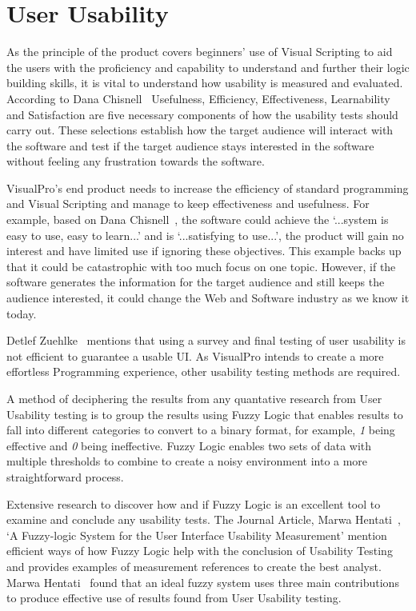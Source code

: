 \documentclass[12pt]{report} %
\begin{document}
	\section{User Usability}
		As the principle of the product covers beginners' use of Visual Scripting to aid the users with the proficiency and capability to understand and further their logic building skills, it is vital to understand how usability is measured and evaluated. According to Dana Chisnell~\cite{chisnell_dana_handbook_2008} Usefulness, Efficiency, Effectiveness, Learnability and Satisfaction are five necessary components of how the usability tests should carry out. These selections establish how the target audience will interact with the software and test if the target audience stays interested in the software without feeling any frustration towards the software. 
			
		VisualPro's end product needs to increase the efficiency of standard programming and Visual Scripting and manage to keep effectiveness and usefulness. For example, based on Dana Chisnell~\cite{chisnell_dana_handbook_2008}, the software could achieve the `...system is easy to use, easy to learn...' and is `...satisfying to use...', the product will gain no interest and have limited use if ignoring these objectives. This example backs up that it could be catastrophic with too much focus on one topic. However, if the software generates the information for the target audience and still keeps the audience interested, it could change the Web and Software industry as we know it today.

		Detlef Zuehlke~\cite{zuehlke_useware_2008} mentions that using a survey and final testing of user usability is not efficient to guarantee a usable UI. As VisualPro intends to create a more effortless Programming experience, other usability testing methods are required.

		A method of deciphering the results from any quantative research from User Usability testing is to group the results using Fuzzy Logic that enables results to fall into different categories to convert to a binary format, for example, \textit{1} being effective and \textit{0} being ineffective. Fuzzy Logic enables two sets of data with multiple thresholds to combine to create a noisy environment into a more straightforward process.

		Extensive research to discover how and if Fuzzy Logic is an excellent tool to examine and conclude any usability tests. The Journal Article, Marwa Hentati~\cite{hentati_fuzzy-logic_2016}, `A Fuzzy-logic System for the User Interface Usability Measurement' mention efficient ways of how Fuzzy Logic help with the conclusion of Usability Testing and provides examples of measurement references to create the best analyst. Marwa Hentati~\cite{hentati_fuzzy-logic_2016} found that an ideal fuzzy system uses three main contributions to produce effective use of results found from User Usability testing.
\end{document}
